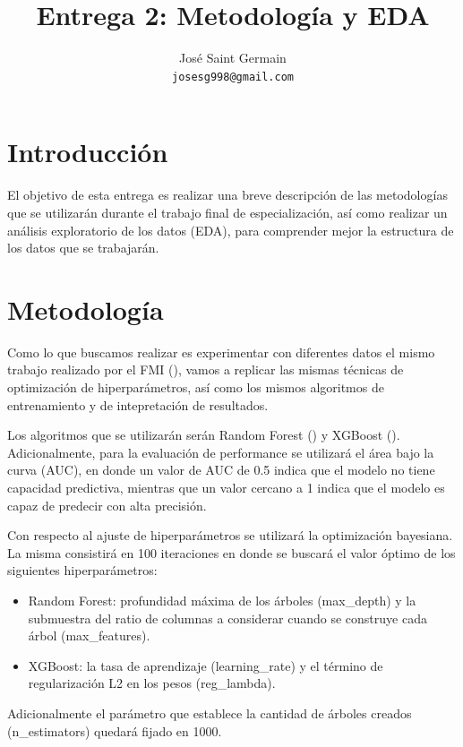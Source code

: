 \documentclass{article}
\title{Entrega 2: Metodología y EDA}
\author{%
  José Saint Germain\\
  \texttt{josesg998@gmail.com} \\
}
\begin{document}
\maketitle

\section{Introducción}
El objetivo de esta entrega es realizar una breve descripción de las metodologías 
que se utilizarán durante el trabajo final de especialización, así como realizar 
un análisis exploratorio de los datos (EDA), para comprender mejor la estructura 
de los datos que se trabajarán.

\section{Metodología}
Como lo que buscamos realizar es experimentar con diferentes datos el mismo 
trabajo realizado por el FMI (\cite{Ceb24}), vamos a replicar las mismas 
técnicas de optimización de hiperparámetros, así como los mismos algoritmos
de entrenamiento y de intepretación de resultados.
 
Los algoritmos que se utilizarán serán Random Forest (\cite{Bre01}) y XGBoost
(\cite{Che16}). Adicionalmente, para la evaluación de performance se utilizará 
el área bajo la curva (AUC), en donde un valor de AUC de 0.5 indica que el modelo 
no tiene capacidad predictiva, mientras que un valor cercano a 1 indica que el 
modelo es capaz de predecir con alta precisión. 

Con respecto al ajuste de hiperparámetros se utilizará la optimización bayesiana.
La misma consistirá en 100 iteraciones en donde se buscará el valor óptimo de los
siguientes hiperparámetros:

\begin{itemize}
  \item Random Forest: profundidad máxima de los árboles (max\_depth) y la 
  submuestra del ratio de columnas a considerar cuando se construye cada árbol 
  (max\_features).
  \item XGBoost: la tasa de aprendizaje (learning\_rate) y el término de 
  regularización L2 en los pesos (reg\_lambda).
\end{itemize}

Adicionalmente el parámetro que establece la cantidad de árboles creados 
(n\_estimators) quedará fijado en 1000.
\end{document}
